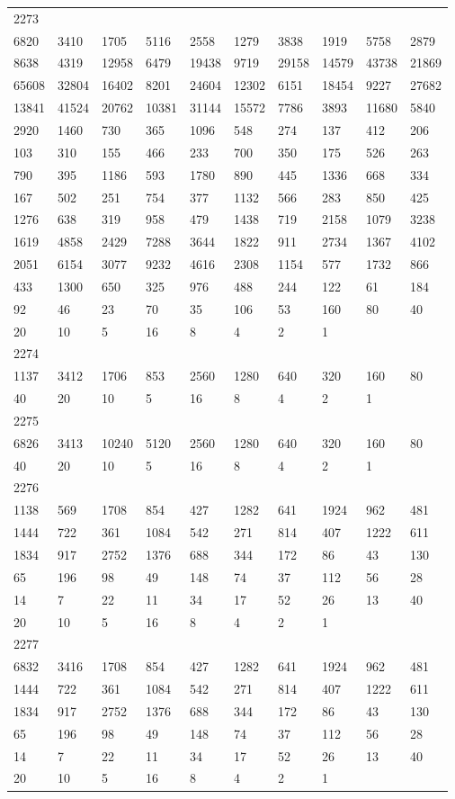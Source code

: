 \begin{longtable}{*{10}{l}}
2273&&&&&&&&&\\
6820& 3410& 1705& 5116& 2558& 1279& 3838& 1919& 5758& 2879\\
8638& 4319& 12958& 6479& 19438& 9719& 29158& 14579& 43738& 21869\\
65608& 32804& 16402& 8201& 24604& 12302& 6151& 18454& 9227& 27682\\
13841& 41524& 20762& 10381& 31144& 15572& 7786& 3893& 11680& 5840\\
2920& 1460& 730& 365& 1096& 548& 274& 137& 412& 206\\
103& 310& 155& 466& 233& 700& 350& 175& 526& 263\\
790& 395& 1186& 593& 1780& 890& 445& 1336& 668& 334\\
167& 502& 251& 754& 377& 1132& 566& 283& 850& 425\\
1276& 638& 319& 958& 479& 1438& 719& 2158& 1079& 3238\\
1619& 4858& 2429& 7288& 3644& 1822& 911& 2734& 1367& 4102\\
2051& 6154& 3077& 9232& 4616& 2308& 1154& 577& 1732& 866\\
433& 1300& 650& 325& 976& 488& 244& 122& 61& 184\\
92& 46& 23& 70& 35& 106& 53& 160& 80& 40\\
20& 10& 5& 16& 8& 4& 2& 1& \\

2274&&&&&&&&&\\
1137& 3412& 1706& 853& 2560& 1280& 640& 320& 160& 80\\
40& 20& 10& 5& 16& 8& 4& 2& 1& \\

2275&&&&&&&&&\\
6826& 3413& 10240& 5120& 2560& 1280& 640& 320& 160& 80\\
40& 20& 10& 5& 16& 8& 4& 2& 1& \\

2276&&&&&&&&&\\
1138& 569& 1708& 854& 427& 1282& 641& 1924& 962& 481\\
1444& 722& 361& 1084& 542& 271& 814& 407& 1222& 611\\
1834& 917& 2752& 1376& 688& 344& 172& 86& 43& 130\\
65& 196& 98& 49& 148& 74& 37& 112& 56& 28\\
14& 7& 22& 11& 34& 17& 52& 26& 13& 40\\
20& 10& 5& 16& 8& 4& 2& 1& \\

2277&&&&&&&&&\\
6832& 3416& 1708& 854& 427& 1282& 641& 1924& 962& 481\\
1444& 722& 361& 1084& 542& 271& 814& 407& 1222& 611\\
1834& 917& 2752& 1376& 688& 344& 172& 86& 43& 130\\
65& 196& 98& 49& 148& 74& 37& 112& 56& 28\\
14& 7& 22& 11& 34& 17& 52& 26& 13& 40\\
20& 10& 5& 16& 8& 4& 2& 1& \\


\end{longtable}
